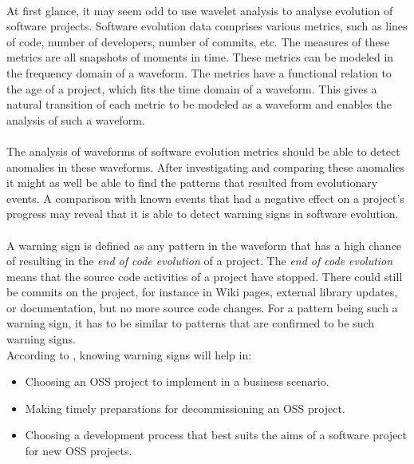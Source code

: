 \paragraph{}
At first glance, it may seem odd to use wavelet analysis to analyse evolution of
software projects. Software evolution data comprises various metrics, such as
lines of code, number of developers, number of commits, etc. The measures of
these metrics are all snapshots of moments in time. These metrics can be
modeled in the frequency domain of a waveform. The metrics have a functional
relation to the age of a project, which fits the time domain of a waveform.
This gives a natural transition of each metric to be modeled as a waveform and
enables the analysis of such a waveform.

\paragraph{}
The analysis of waveforms of software evolution metrics should be able to
detect anomalies in these waveforms. After investigating and comparing these
anomalies it might as well be able to find the patterns that resulted from
evolutionary events. A comparison with known events that had a negative effect
on a project's progress may reveal that it is able to detect warning signs in
software evolution.

\paragraph{}
A warning sign is defined as any pattern in the waveform that has a high chance
of resulting in the \textit{end of code evolution} of a project. The
\textit{end of code evolution} means that the source code activities of a
project have stopped. There could still be commits on the project, for instance
in Wiki pages, external library updates, or documentation, but no more source
code changes. For a pattern being such a warning sign, it has to be similar to
patterns that are confirmed to be such warning signs.\\[1ex]

\noindent
According to \citet{karus2013}, knowing warning signs will help in:
\begin{itemize}
	\item Choosing an OSS project to implement in a business scenario.
	\item Making timely preparations for decommissioning an OSS project.
	\item Choosing a development process that best suits the aims of a software
	project for new OSS projects.
\end{itemize}




